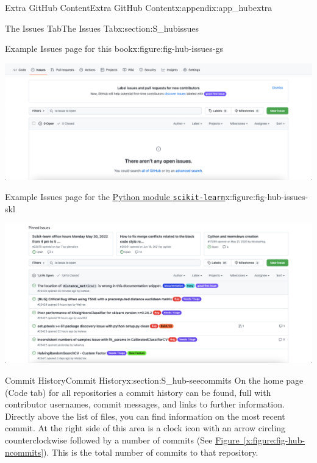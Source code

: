 \documentclass[oneside,10pt,]{book}
\newcommand{\xreffont}{\relax}
\newcommand{\mono}[1]{\texttt{#1}}
\begin{document}
\begin{appendixptx}{Extra GitHub Content}{}{Extra GitHub Content}{}{}{x:appendix:app_hubextra}
\begin{sectionptx}{The Issues Tab}{}{The Issues Tab}{}{}{x:section:S_hubissues}
\begin{figureptx}{Example Issues page for this book}{x:figure:fig-hub-issues-gs}{}
\begin{image}{0.05}{0.9}{0.05}%
\includegraphics[width=\linewidth]{external/hub_issues_gs.pdf}
\end{image}%
\tcblower
\end{figureptx}%
\begin{figureptx}{Example Issues page for the \href{https://github.com/scikit-learn/scikit-learn/issues}{Python module \mono{scikit-learn}}\protect\footnotemark{}}{x:figure:fig-hub-issues-skl}{}%
\begin{image}{0.05}{0.9}{0.05}%
\includegraphics[width=\linewidth]{external/hub_issues_skl.pdf}
\end{image}%
\tcblower
\end{figureptx}%
%
\end{sectionptx}
%
%
\typeout{************************************************}
\typeout{************************************************}
%
\begin{sectionptx}{Commit History}{}{Commit History}{}{}{x:section:S_hub-seecommits}
%
%
On the home page (Code tab) for all repositories a commit history can be found, full with contributor usernames, commit messages, and links to further information. Directly above the list of files, you can find information on the most recent commit. At the right side of this area is a clock icon with an arrow circling counterclockwise followed by a number of commits (See \hyperref[x:figure:fig-hub-ncommits]{Figure~{\xreffont\ref{x:figure:fig-hub-ncommits}}}). This is the total number of commits to that repository.%

\end{sectionptx}
\end{appendixptx}
\end{document}

